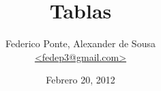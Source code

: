 \documentclass[11pt,fleqn]{article}
\begin{document}
\title{Tablas}
\author{Federico Ponte, Alexander de Sousa\\
\href{mailto:fedep3@gmail.com}{<fedep3@gmail.com>}}

\date{Febrero 20, 2012}
\maketitle




\end{document}

